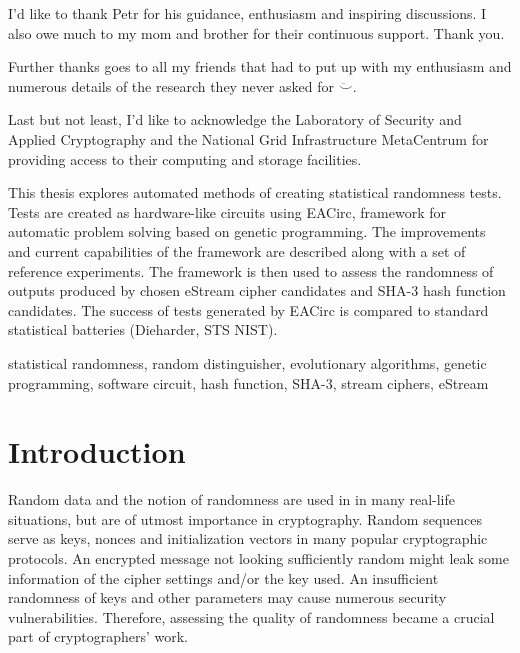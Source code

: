 \documentclass[12pt,oneside]{fithesis2}		%
\renewcommand{\_}{\leavevmode \kern0.0em\vbox{\hrule width0.4em}}
\begin{document}
\FrontMatter
\ThesisTitlePage

\begin{ThesisDeclaration}
\DeclarationText
\AdvisorName
\end{ThesisDeclaration}

\begin{ThesisThanks}
I'd like to thank Petr for his guidance, enthusiasm and inspiring discussions.
I also owe much to my mom and brother for their continuous support. Thank you.

\noindent
Further thanks goes to all my friends that had to put up with my enthusiasm 
and numerous details of the research they never asked for $\ddot\smile$.

\noindent
Last but not least, I'd like to acknowledge the Laboratory of Security and Applied Cryptography and 
the National Grid Infrastructure MetaCentrum for providing access to their computing and storage facilities.
\end{ThesisThanks}

\begin{ThesisAbstract}
This thesis explores automated methods of creating statistical randomness tests. Tests are created as hardware-like circuits using
EACirc, framework for automatic problem solving based on genetic programming. The improvements and current capabilities
of the framework are described along with a set of reference experiments.
The framework is then used to assess the randomness of outputs produced by chosen eStream cipher candidates
and SHA-3 hash function candidates.
The success of tests generated by EACirc is compared to standard statistical batteries (Dieharder, STS NIST).
\end{ThesisAbstract}

\begin{ThesisKeyWords}
statistical randomness, random distinguisher, evolutionary algorithms, genetic programming, software circuit, 
hash function, SHA-3, stream ciphers, eStream
\end{ThesisKeyWords}

\MainMatter
\tableofcontents
\chapter{Introduction}
\label{chap:intro}

Random data and the notion of randomness are used in in many real-life situations, but are of utmost importance in cryptography.
Random sequences serve as keys, nonces and initialization vectors in many popular cryptographic protocols.
An encrypted message not looking sufficiently random might leak some information of the cipher settings and/or the key used.
An insufficient randomness of keys and other parameters may cause numerous security vulnerabilities.
Therefore, assessing the quality of randomness became a crucial part of cryptographers' work.
\end{document}
